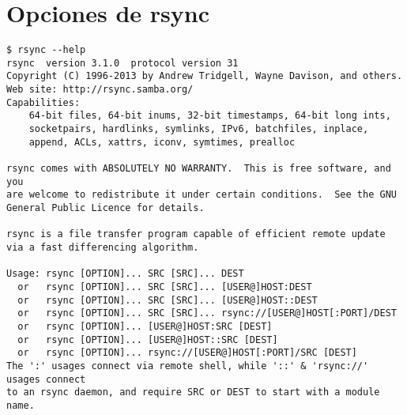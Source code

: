 \section{Opciones de rsync}
\label{sec:rsync}
\begin{lstlisting}
$ rsync --help
rsync  version 3.1.0  protocol version 31
Copyright (C) 1996-2013 by Andrew Tridgell, Wayne Davison, and others.
Web site: http://rsync.samba.org/
Capabilities:
    64-bit files, 64-bit inums, 32-bit timestamps, 64-bit long ints,
    socketpairs, hardlinks, symlinks, IPv6, batchfiles, inplace,
    append, ACLs, xattrs, iconv, symtimes, prealloc

rsync comes with ABSOLUTELY NO WARRANTY.  This is free software, and you
are welcome to redistribute it under certain conditions.  See the GNU
General Public Licence for details.

rsync is a file transfer program capable of efficient remote update
via a fast differencing algorithm.

Usage: rsync [OPTION]... SRC [SRC]... DEST
  or   rsync [OPTION]... SRC [SRC]... [USER@]HOST:DEST
  or   rsync [OPTION]... SRC [SRC]... [USER@]HOST::DEST
  or   rsync [OPTION]... SRC [SRC]... rsync://[USER@]HOST[:PORT]/DEST
  or   rsync [OPTION]... [USER@]HOST:SRC [DEST]
  or   rsync [OPTION]... [USER@]HOST::SRC [DEST]
  or   rsync [OPTION]... rsync://[USER@]HOST[:PORT]/SRC [DEST]
The ':' usages connect via remote shell, while '::' & 'rsync://' usages connect
to an rsync daemon, and require SRC or DEST to start with a module name.


\end{lstlisting}
